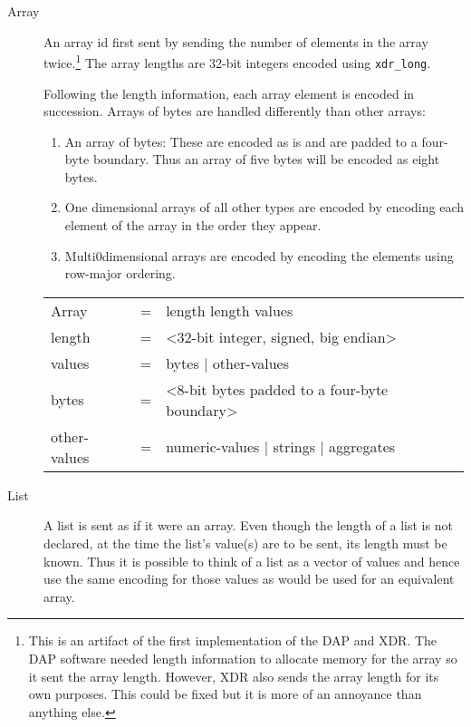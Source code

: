 \documentclass{article}
\begin{document}
\begin{description}
  
\item [Array] An array id first sent by sending the number of elements in the
  array twice.\footnote{This is an artifact of the first implementation of
    the DAP and XDR. The DAP software needed length information to allocate
    memory for the array so it sent the array length. However, XDR also sends
    the array length for its own purposes. This could be fixed but it is more
    of an annoyance than anything else.} The array lengths are 32-bit
  integers encoded using \texttt{xdr\_long}.

  Following the length information, each array element is encoded in
  succession. Arrays of bytes are handled differently than other arrays:
\begin{enumerate}
\item An array of bytes: These are encoded as is and are padded to a
  four-byte boundary. Thus an array of five bytes will be encoded as eight
  bytes.
  
\item One dimensional arrays of all other types are encoded by encoding each
  element of the array in the order they appear.

\item Multi0dimensional arrays are encoded by encoding the elements using
  row-major ordering.
\end{enumerate}

\begin{ttfamily}
\begin{center}
\begin{tabular}{lll}
Array & = & length length values \\
length & = & <32-bit integer, signed, big endian> \\
values & = & bytes | other-values \\
bytes & = & <8-bit bytes padded to a four-byte boundary> \\
other-values & = & numeric-values | strings | aggregates \\
\end{tabular}
\end{center}
\end{ttfamily}

\item [List] A list is sent as if it were an array. Even though the length of
  a list is not declared, at the time the list's value(s) are to be sent, its
  length must be known. Thus it is possible to think of a list as a vector of
  values and hence use the same encoding for those values as would be used
  for an equivalent array.


\end{description}
\end{document}
